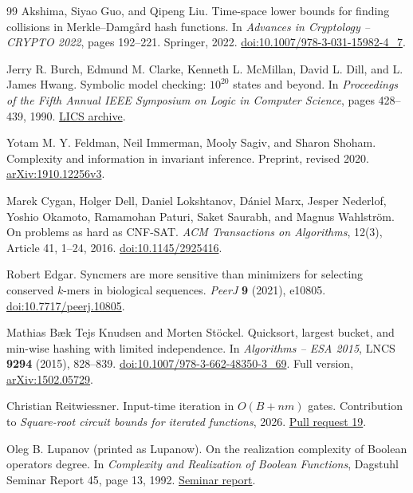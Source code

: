 \documentclass[11pt]{article}
\theoremstyle{definition}
\theoremstyle{remark}
\numberwithin{equation}{section}
\begin{document}
\begin{thebibliography}{99}
Akshima, Siyao Guo, and Qipeng Liu.
\newblock Time-space lower bounds for finding collisions in
{M}erkle--{D}amg{\aa}rd hash functions.
\newblock In \emph{Advances in Cryptology -- CRYPTO 2022}, pages 192--221.
Springer, 2022.
\newblock \href{https://doi.org/10.1007/978-3-031-15982-4_7}{doi:10.1007/978-3-031-15982-4\_7}.

Jerry R. Burch, Edmund M. Clarke, Kenneth L. McMillan, David L. Dill, and
L. James Hwang.
\newblock Symbolic model checking: $10^{20}$ states and beyond.
\newblock In \emph{Proceedings of the Fifth Annual IEEE Symposium on
Logic in Computer Science}, pages 428--439, 1990.
\newblock \href{https://lics.siglog.org/1990/BurchClarkeMcMillan-Symbolicmodelchecki.html}{LICS archive}.

Yotam M. Y. Feldman, Neil Immerman, Mooly Sagiv, and Sharon Shoham.
\newblock Complexity and information in invariant inference.
\newblock Preprint, revised 2020.
\newblock \href{https://arxiv.org/abs/1910.12256v3}{arXiv:1910.12256v3}.

Marek Cygan, Holger Dell, Daniel Lokshtanov, D\'aniel Marx, Jesper Nederlof,
Yoshio Okamoto, Ramamohan Paturi, Saket Saurabh, and Magnus Wahlstr\"om.
\newblock On problems as hard as CNF-SAT.
\newblock \emph{ACM Transactions on Algorithms}, 12(3), Article 41,
1--24, 2016.
\newblock \href{https://doi.org/10.1145/2925416}{doi:10.1145/2925416}.

Robert Edgar.
Syncmers are more sensitive than minimizers for selecting conserved
$k$-mers in biological sequences.
\emph{PeerJ} \textbf{9} (2021), e10805.
\href{https://doi.org/10.7717/peerj.10805}{doi:10.7717/peerj.10805}.

Mathias B{\ae}k Tejs Knudsen and Morten St\"ockel.
Quicksort, largest bucket, and min-wise hashing with limited independence.
In \emph{Algorithms -- ESA 2015}, LNCS \textbf{9294} (2015), 828--839.
\href{https://doi.org/10.1007/978-3-662-48350-3_69}{doi:10.1007/978-3-662-48350-3\_69}.
Full version, \href{https://arxiv.org/abs/1502.05729}{arXiv:1502.05729}.

Christian Reitwiessner.
\newblock Input-time iteration in $O(B+nm)$ gates.
\newblock Contribution to \emph{Square-root circuit bounds for iterated
functions}, 2026. \href{https://github.com/SamuelSchlesinger/iterating-functions/pull/19}{Pull request 19}.

Oleg B. Lupanov (printed as Lupanow).
\newblock On the realization complexity of Boolean operators degree.
\newblock In \emph{Complexity and Realization of Boolean Functions},
Dagstuhl Seminar Report 45, page 13, 1992.
\newblock \href{https://doi.org/10.4230/DagSemRep.45}{Seminar report}.


\end{thebibliography}
\end{document}
